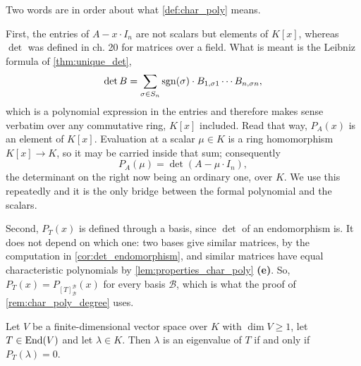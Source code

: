 \begin{remark}
\label{rem:char_poly_well_defined}
Two words are in order about what \cref{def:char_poly} means.

First, the entries of $A - x \cdot I_n$ are not scalars but elements of $K[x]$, whereas $\det$ was defined in ch. 20 for matrices over a field. What is meant is the Leibniz formula of \cref{thm:unique_det},
\[
\det B = \sum_{\sigma \in S_n} \operatorname{sgn}(\sigma) \cdot B_{1,\sigma 1} \cdots B_{n, \sigma n},
\]
which is a polynomial expression in the entries and therefore makes sense verbatim over any commutative ring, $K[x]$ included. Read that way, $P_A(x)$ is an element of $K[x]$. Evaluation at a scalar $\mu \in K$ is a ring homomorphism $K[x] \to K$, so it may be carried inside that sum; consequently
\[
P_A(\mu) = \det(A - \mu \cdot I_n),
\]
the determinant on the right now being an ordinary one, over $K$. We use this repeatedly and it is the only bridge between the formal polynomial and the scalars.

Second, $P_T(x)$ is defined through a basis, since $\det$ of an endomorphism is. It does not depend on which one: two bases give similar matrices, by the computation in \cref{cor:det_endomorphism}, and similar matrices have equal characteristic polynomials by \cref{lem:properties_char_poly} \textbf{(e)}. So, $P_T(x) = P_{[T]_{\mathcal{B}}^{\mathcal{B}}}(x)$ for every basis $\mathcal{B}$, which is what the proof of \cref{rem:char_poly_degree} uses.
\end{remark}

\begin{aiproposition}
\label{aiprop:eigenvalue_iff_root}
Let $V$ be a finite-di\-men\-sional vector space over $K$ with $\dim V \ge 1$, let $T \in \operatorname{End}(V)$ and let $\lambda \in K$. Then $\lambda$ is an eigenvalue of $T$ if and only if $P_T(\lambda) = 0$.
\end{aiproposition}

